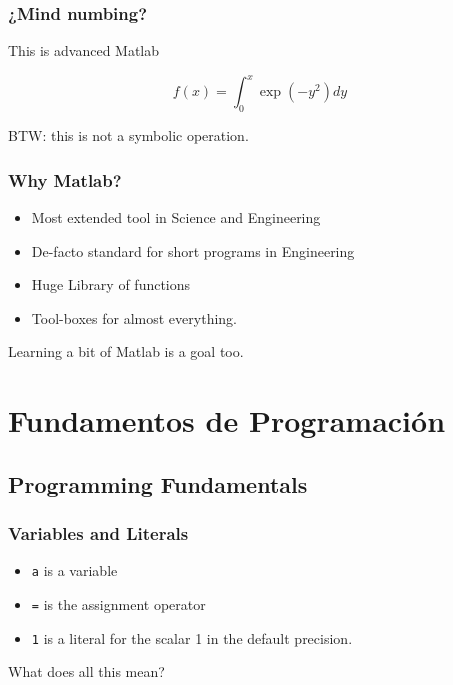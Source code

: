 \documentclass[12pt]{beamer}
\begin{document}
\begin{frame}
  \frametitle{¿Mind numbing?}
This is advanced Matlab

\[ f(x) = \int_0^x \exp(-y^2) dy \]

\testcode

BTW: this is not a symbolic operation.
\end{frame}

\begin{frame}
  \frametitle{Why Matlab?}

  \begin{itemize}
  \item Most extended tool in Science and Engineering
  \item De-facto standard for short programs in Engineering
  \item Huge Library of functions
  \item Tool-boxes for almost everything.
  \end{itemize}

  Learning a bit of Matlab is a goal too.
\end{frame}

\section{Fundamentos de Programación}
\subsection{Programming Fundamentals}

\begin{frame}
  \frametitle{Variables and Literals}
\testcode
\begin{itemize}
\item \texttt{a} is a variable
\item \texttt{=} is the assignment operator
\item \texttt{1} is a literal for the scalar 1 in the default
  precision.
\end{itemize}
\begin{center}
  What does all this mean?
\end{center}
\end{frame}
\end{document}
